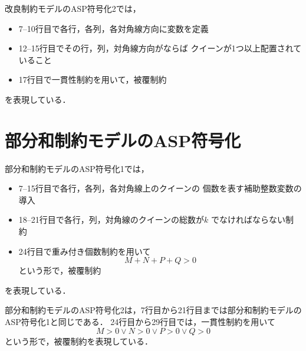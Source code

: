 改良制約モデルのASP符号化2では，
\begin{itemize}
 \item 7--10行目で各行，各列，各対角線方向に変数を定義
 \item 12--15行目でその行，列，対角線方向がならば
  クイーンが1つ以上配置されていること
 \item 17行目で一貫性制約を用いて，被覆制約
\end{itemize}
を表現している．

\section{部分和制約モデルのASP符号化}




部分和制約モデルのASP符号化1では，
\begin{itemize}
 \item 7--15行目で各行，各列，各対角線上のクイーンの
個数を表す補助整数変数の導入
 \item 18--21行目で各行，列，対角線のクイーンの総数が$k$
でなければならない制約 
 \item 24行目で重み付き個数制約を用いて
	$$M+N+P+Q>0$$
  という形で，被覆制約
\end{itemize}
を表現している．

部分和制約モデルのASP符号化2は，7行目から21行目までは部分和制約モデルのASP符号化1と同じである．
24行目から29行目では，一貫性制約を用いて
$$M>0 \vee N>0 \vee P>0 \vee Q>0$$
という形で，被覆制約を表現している．


